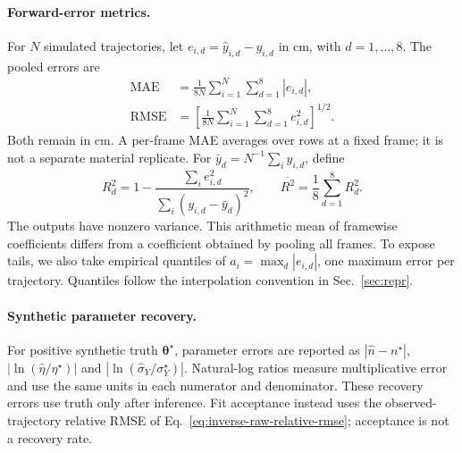 \paragraph{Forward-error metrics.}
For $N$ simulated trajectories, let
$e_{i,d}=\hat y_{i,d}-y_{i,d}$ in cm, with $d=1,\ldots,8$.
The pooled errors are
\begin{equation}
\label{eq:mae}
\begin{aligned}
 \mathrm{MAE}&=\frac{1}{8N}\sum_{i=1}^{N}\sum_{d=1}^{8}|e_{i,d}|,\\
 \mathrm{RMSE}&=\left[\frac{1}{8N}\sum_{i=1}^{N}\sum_{d=1}^{8}
                                        e_{i,d}^{2}\right]^{1/2}.
\end{aligned}
\end{equation}
Both remain in cm. A per-frame MAE averages over rows at a fixed
frame; it is not a separate material replicate. For
$\bar y_d=N^{-1}\sum_i y_{i,d}$, define
\begin{equation}
\label{eq:forward-r2}
 R_d^2=1-\frac{\sum_i e_{i,d}^2}{\sum_i(y_{i,d}-\bar y_d)^2},
 \qquad \overline{R^2}=\frac18\sum_{d=1}^{8}R_d^2.
\end{equation}
The outputs have nonzero variance. This arithmetic mean of framewise
coefficients differs from a coefficient obtained by pooling all
frames. To expose tails, we also take empirical quantiles of
$a_i=\max_d|e_{i,d}|$, one maximum error per trajectory. Quantiles
follow the interpolation convention in Sec.~\ref{sec:repr}.

\paragraph{Synthetic parameter recovery.}
For positive synthetic truth $\boldsymbol\theta^\star$, parameter
errors are reported as $|\hat n-n^\star|$,
$|\ln(\hat\eta/\eta^\star)|$ and
$|\ln(\hat\sigma_Y/\sigma_Y^\star)|$. Natural-log ratios measure
multiplicative error and use the same units in each numerator and
denominator. These recovery errors use truth only after inference.
Fit acceptance instead uses the observed-trajectory relative RMSE of
Eq.~\eqref{eq:inverse-raw-relative-rmse}; acceptance is not a recovery rate.

